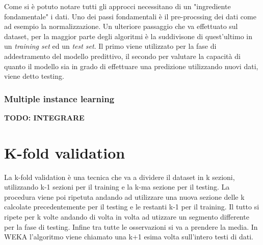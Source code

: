 Come si è potuto notare tutti gli approcci necessitano di un "ingrediente fondamentale" i dati. Uno dei passi fondamentali è il pre-procssing dei dati come ad esempio la normalizzazione. 
Un ulteriore passaggio che va effettuato sul dataset, per la maggior parte degli algoritmi è la suddivisone di quest'ultimo in un \textit{training set} ed un \textit{test set}. Il primo viene utilizzato per la fase di addestramento del modello predittivo, il secondo per valutare la capacità di quanto il modello sia in grado di effettuare una predizione utilizzando nuovi dati, viene detto testing. 

\subsubsection{Multiple instance learning}
\textbf{TODO: INTEGRARE}
\section{K-fold validation}
La k-fold validation è una tecnica che va a dividere il dataset in k sezioni, utilizzando k-1 sezioni per il training e la k-ma sezione per il testing. La procedura viene poi ripetuta andando ad utilizzare una nuova sezione delle k calcolate precedentemente per il testing e le restanti k-1 per il training. Il tutto si ripete per k volte andando di volta in volta ad utizzare un segmento differente per la fase di testing. Infine tra tutte le osservazioni si va a prendere la media. In WEKA l'algoritmo viene chiamato una k+1 esima volta sull'intero testi di dati\cite{kcross}. 
